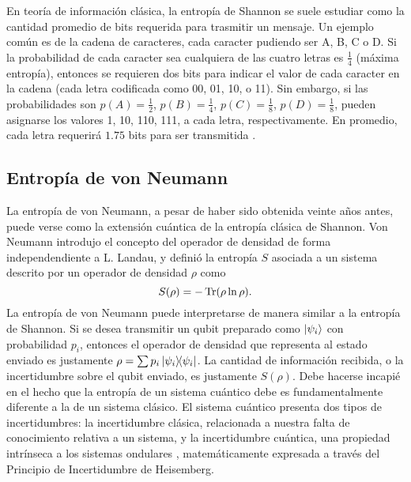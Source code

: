 En teoría de información clásica, la entropía de Shannon se suele estudiar como la cantidad promedio de bits requerida para trasmitir un mensaje. Un ejemplo común es de la cadena de caracteres, cada caracter pudiendo ser A, B, C o D. Si la probabilidad de cada caracter sea cualquiera de las cuatro letras es $\frac{1}{4}$ (máxima entropía), entonces se requieren dos bits para indicar el valor de cada caracter en la cadena (cada letra codificada como 00, 01, 10, o 11). Sin embargo, si las probabilidades son $p(A)=\frac{1}{2}$, $p(B)=\frac{1}{4}$, $p(C)=\frac{1}{8}$, $p(D)=\frac{1}{8}$, pueden asignarse los valores 1, 10, 110, 111, a cada letra, respectivamente. En promedio, cada letra requerirá $1.75$ bits para ser transmitida \cite{Chuang}. 

\subsection{Entropía de von Neumann}

La entropía de von Neumann, a pesar de haber sido obtenida veinte años antes, puede verse como la extensión cuántica de la entropía clásica de Shannon. Von Neumann introdujo el concepto del operador de densidad de forma independendiente a L. Landau, y definió la entropía $S$ asociada a un sistema descrito por un operador de densidad $\rho$ como \cite{vonNeumann}
\begin{equation}\label{eq:VonNeumannEntropy}
    S(\rho)=-\Tr(\rho\ln{\rho}).
\end{equation}
La entropía de von Neumann puede interpretarse de manera similar a la entropía de Shannon. Si se desea transmitir un qubit preparado como $\ket{\psi_{i}}$ con probabilidad $p_{i}$, entonces el operador de densidad que representa al estado enviado es justamente $\rho=\sum p_{i}\dyad{\psi_{i}}$. La cantidad de información recibida, o la incertidumbre sobre el qubit enviado, es justamente $S(\rho)$. Debe hacerse incapié en el hecho que la entropía de un sistema cuántico debe es fundamentalmente diferente a la de un sistema clásico. El sistema cuántico presenta dos tipos de incertidumbres: la incertidumbre clásica, relacionada a nuestra falta de conocimiento relativa a un sistema, y la incertidumbre cuántica, una propiedad intrínseca a los sistemas ondulares , matemáticamente expresada a través del Principio de Incertidumbre de Heisemberg\cite{Wilde}.

